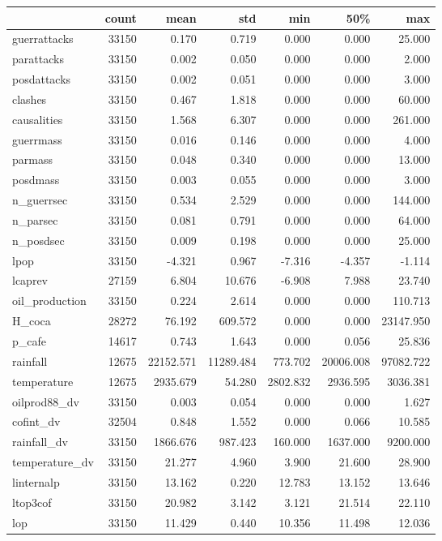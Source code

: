 \begin{tabular}{lrrrrrr}
\toprule
{} & count &      mean &       std &      min &       50\% &       max \\
\midrule
guerrattacks   & 33150 &     0.170 &     0.719 &    0.000 &     0.000 &    25.000 \\
parattacks     & 33150 &     0.002 &     0.050 &    0.000 &     0.000 &     2.000 \\
posdattacks    & 33150 &     0.002 &     0.051 &    0.000 &     0.000 &     3.000 \\
clashes        & 33150 &     0.467 &     1.818 &    0.000 &     0.000 &    60.000 \\
causalities    & 33150 &     1.568 &     6.307 &    0.000 &     0.000 &   261.000 \\
guerrmass      & 33150 &     0.016 &     0.146 &    0.000 &     0.000 &     4.000 \\
parmass        & 33150 &     0.048 &     0.340 &    0.000 &     0.000 &    13.000 \\
posdmass       & 33150 &     0.003 &     0.055 &    0.000 &     0.000 &     3.000 \\
n\_guerrsec     & 33150 &     0.534 &     2.529 &    0.000 &     0.000 &   144.000 \\
n\_parsec       & 33150 &     0.081 &     0.791 &    0.000 &     0.000 &    64.000 \\
n\_posdsec      & 33150 &     0.009 &     0.198 &    0.000 &     0.000 &    25.000 \\
lpop           & 33150 &    -4.321 &     0.967 &   -7.316 &    -4.357 &    -1.114 \\
lcaprev        & 27159 &     6.804 &    10.676 &   -6.908 &     7.988 &    23.740 \\
oil\_production & 33150 &     0.224 &     2.614 &    0.000 &     0.000 &   110.713 \\
H\_coca         & 28272 &    76.192 &   609.572 &    0.000 &     0.000 & 23147.950 \\
p\_cafe         & 14617 &     0.743 &     1.643 &    0.000 &     0.056 &    25.836 \\
rainfall       & 12675 & 22152.571 & 11289.484 &  773.702 & 20006.008 & 97082.722 \\
temperature    & 12675 &  2935.679 &    54.280 & 2802.832 &  2936.595 &  3036.381 \\
oilprod88\_dv   & 33150 &     0.003 &     0.054 &    0.000 &     0.000 &     1.627 \\
cofint\_dv      & 32504 &     0.848 &     1.552 &    0.000 &     0.066 &    10.585 \\
rainfall\_dv    & 33150 &  1866.676 &   987.423 &  160.000 &  1637.000 &  9200.000 \\
temperature\_dv & 33150 &    21.277 &     4.960 &    3.900 &    21.600 &    28.900 \\
linternalp     & 33150 &    13.162 &     0.220 &   12.783 &    13.152 &    13.646 \\
ltop3cof       & 33150 &    20.982 &     3.142 &    3.121 &    21.514 &    22.110 \\
lop            & 33150 &    11.429 &     0.440 &   10.356 &    11.498 &    12.036 \\
\bottomrule
\end{tabular}
